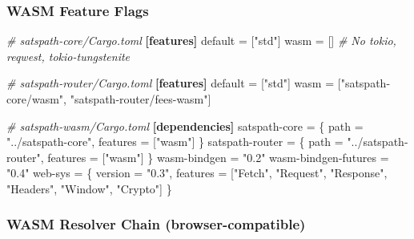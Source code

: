 \documentclass[
]{article}
\newenvironment{Shaded}{}{}
\newcommand{\CommentTok}[1]{\textcolor[rgb]{0.38,0.63,0.69}{\textit{#1}}}
\newcommand{\DataTypeTok}[1]{\textcolor[rgb]{0.56,0.13,0.00}{#1}}
\newcommand{\KeywordTok}[1]{\textcolor[rgb]{0.00,0.44,0.13}{\textbf{#1}}}
\newcommand{\OperatorTok}[1]{\textcolor[rgb]{0.40,0.40,0.40}{#1}}
\newcommand{\StringTok}[1]{\textcolor[rgb]{0.25,0.44,0.63}{#1}}
\begin{document}
\hypertarget{wasm-feature-flags}{%
\subsubsection{WASM Feature Flags}\label{wasm-feature-flags}}

\begin{Shaded}
\begin{Highlighting}[]
\CommentTok{\# satspath{-}core/Cargo.toml}
\KeywordTok{[features]}
\DataTypeTok{default} \OperatorTok{=} \OperatorTok{[}\StringTok{"std"}\OperatorTok{]}
\DataTypeTok{wasm} \OperatorTok{=} \OperatorTok{[]}  \CommentTok{\# No tokio, reqwest, tokio{-}tungstenite}

\CommentTok{\# satspath{-}router/Cargo.toml}
\KeywordTok{[features]}
\DataTypeTok{default} \OperatorTok{=} \OperatorTok{[}\StringTok{"std"}\OperatorTok{]}
\DataTypeTok{wasm} \OperatorTok{=} \OperatorTok{[}\StringTok{"satspath{-}core/wasm"}\OperatorTok{,} \StringTok{"satspath{-}router/fees{-}wasm"}\OperatorTok{]}

\CommentTok{\# satspath{-}wasm/Cargo.toml}
\KeywordTok{[dependencies]}
\DataTypeTok{satspath{-}core} \OperatorTok{=} \OperatorTok{\{ }\DataTypeTok{path}\OperatorTok{ =} \StringTok{"../satspath{-}core"}\OperatorTok{, }\DataTypeTok{features}\OperatorTok{ =} \OperatorTok{[}\StringTok{"wasm"}\OperatorTok{] \}}
\DataTypeTok{satspath{-}router} \OperatorTok{=} \OperatorTok{\{ }\DataTypeTok{path}\OperatorTok{ =} \StringTok{"../satspath{-}router"}\OperatorTok{, }\DataTypeTok{features}\OperatorTok{ =} \OperatorTok{[}\StringTok{"wasm"}\OperatorTok{] \}}
\DataTypeTok{wasm{-}bindgen} \OperatorTok{=} \StringTok{"0.2"}
\DataTypeTok{wasm{-}bindgen{-}futures} \OperatorTok{=} \StringTok{"0.4"}
\DataTypeTok{web{-}sys} \OperatorTok{=} \OperatorTok{\{ }\DataTypeTok{version}\OperatorTok{ =} \StringTok{"0.3"}\OperatorTok{, }\DataTypeTok{features}\OperatorTok{ =} \OperatorTok{[}\StringTok{"Fetch"}\OperatorTok{,} \StringTok{"Request"}\OperatorTok{,} \StringTok{"Response"}\OperatorTok{,} \StringTok{"Headers"}\OperatorTok{,} \StringTok{"Window"}\OperatorTok{,} \StringTok{"Crypto"}\OperatorTok{] \}}
\end{Highlighting}
\end{Shaded}

\hypertarget{wasm-resolver-chain-browser-compatible}{%
\subsubsection{WASM Resolver Chain
(browser-compatible)}\label{wasm-resolver-chain-browser-compatible}}
\end{document}
